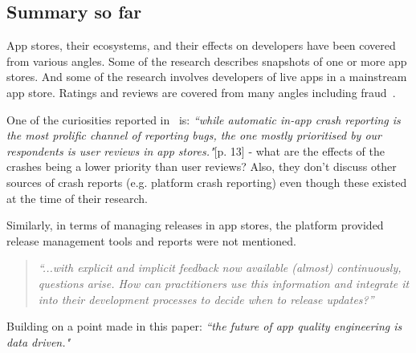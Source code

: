 


\subsection{Summary so far} %
App stores, their ecosystems, and their effects on developers have been covered from various angles. Some of the research describes snapshots of one or more app stores. And some of the research involves developers of live apps in a mainstream app store. Ratings and reviews are covered from many angles including fraud~\citep{xie2015_appwatcher_unveiling_the_underground_market_of_trading_mobile_app_reviews}. 

One of the curiosities reported in~\citet{alsubaihin2019app_store_effects_on_software_engineering} is: \emph{``while automatic in-app crash reporting is the most prolific channel of reporting bugs, the one mostly prioritised by our respondents is user reviews in app stores."}[p. 13] - what are the effects of the crashes being a lower priority than user reviews? Also, they don't discuss other sources of crash reports (e.g. platform crash reporting) even though these existed at the time of their research.

Similarly, in terms of managing releases in app stores, the platform provided release management tools and reports were not mentioned. 

\begin{quote}
    \emph{``...with explicit and implicit feedback now available (almost) continuously, questions arise. How can practitioners use this information and integrate it into their development processes to decide when to release updates?''}\citep[pp. 48-49]{maalej2016_towards_data_driven_requirements_engineering}    
\end{quote}

Building on a point made in this paper: \emph{``the future of app quality engineering is data driven."}~\citep[p. 24]{nagappan2016_future_trends_in_sw_eng_for_mobile_apps} %





